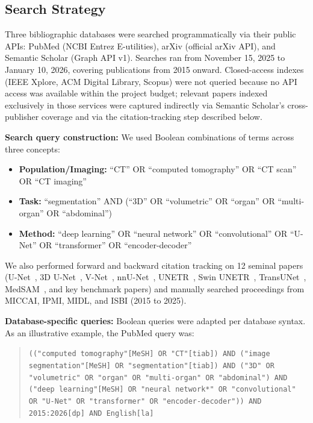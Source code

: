 \documentclass[conference]{IEEEtran}
\begin{document}
\subsection{Search Strategy}

Three bibliographic databases were searched programmatically via their public APIs: PubMed (NCBI Entrez E-utilities), arXiv (official arXiv API), and Semantic Scholar (Graph API v1). Searches ran from November 15, 2025 to January 10, 2026, covering publications from 2015 onward. Closed-access indexes (IEEE Xplore, ACM Digital Library, Scopus) were not queried because no API access was available within the project budget; relevant papers indexed exclusively in those services were captured indirectly via Semantic Scholar's cross-publisher coverage and via the citation-tracking step described below.

\textbf{Search query construction:} We used Boolean combinations of terms across three concepts:

\begin{itemize}
    \item \textbf{Population/Imaging:} ``CT'' OR ``computed tomography'' OR ``CT scan'' OR ``CT imaging''
    \item \textbf{Task:} ``segmentation'' AND (``3D'' OR ``volumetric'' OR ``organ'' OR ``multi-organ'' OR ``abdominal'')
    \item \textbf{Method:} ``deep learning'' OR ``neural network'' OR ``convolutional'' OR ``U-Net'' OR ``transformer'' OR ``encoder-decoder''
\end{itemize}

We also performed forward and backward citation tracking on 12 seminal papers (U-Net~\cite{ronneberger2015unet}, 3D U-Net~\cite{cicek20163dunet}, V-Net~\cite{milletari2016vnet}, nnU-Net~\cite{isensee2021nnunet}, UNETR~\cite{hatamizadeh2022unetr}, Swin UNETR~\cite{swinunetr2022}, TransUNet~\cite{chen2024transunet}, MedSAM~\cite{ma2024medsam}, and key benchmark papers) and manually searched proceedings from MICCAI, IPMI, MIDL, and ISBI (2015 to 2025).

\textbf{Database-specific queries:} Boolean queries were adapted per database syntax. As an illustrative example, the PubMed query was:

\pagebreak

\begin{quote}
\small
\texttt{(("computed tomography"[MeSH] OR "CT"[tiab]) AND ("image segmentation"[MeSH] OR "segmentation"[tiab]) AND ("3D" OR "volumetric" OR "organ" OR "multi-organ" OR "abdominal") AND ("deep learning"[MeSH] OR "neural network*" OR "convolutional" OR "U-Net" OR "transformer" OR "encoder-decoder")) AND 2015:2026[dp] AND English[la]}
\end{quote}
\end{document}
